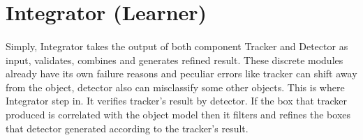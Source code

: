 \documentclass{report}
\begin{document}
    \section{Integrator (Learner)}
        \paragraph{}
            Simply, Integrator takes the output of both component Tracker and Detector as input, validates, combines
            and generates refined result. These discrete modules already have its own failure reasons
            and peculiar errors like tracker can shift away from the object, detector also can misclassify some other objects. This is
            where Integrator step in. It verifies tracker's result by detector. If the box that tracker produced is correlated with the object model
            then it filters and refines the boxes that detector generated according to the tracker's result.
\end{document}

